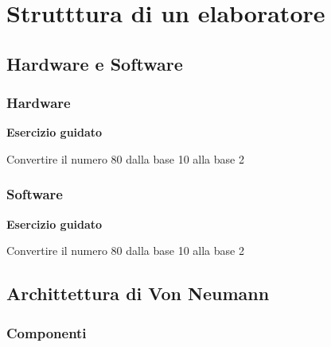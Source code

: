 \documentclass[11pt,fleqn]{book}
\begin{document}

\part{Strutttura di un elaboratore}



\chapter{Hardware e Software}

\section{Hardware}

\begin{esercizio}[1]
    \textbf{Esercizio guidato}

    Convertire il numero 80 dalla base 10 alla base 2

    \lipsum[1]
\end{esercizio}

\section{Software}

\begin{esercizio}[1]
    \textbf{Esercizio guidato}

    Convertire il numero 80 dalla base 10 alla base 2

    \lipsum[1]
\end{esercizio}



\chapter{Archittettura di Von Neumann}

\section{Componenti}
\end{document}
